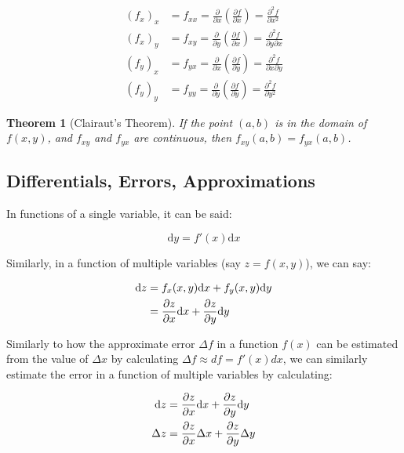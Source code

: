 \documentclass[12pt]{article}
\newtheorem{theorem}{Theorem}
\begin{document}
\begin{equation}
    \begin{split}
      (f_x)_x &= f_{xx} = \frac{\partial}{\partial x}(\frac{\partial f}{\partial x}) = \frac{\partial^2f}{\partial x^2}\\
      (f_x)_y &= f_{xy} = \frac{\partial}{\partial y}(\frac{\partial f}{\partial x}) = \frac{\partial^2f}{\partial y \partial x}\\
    (f_y)_x &= f_{yx} = \frac{\partial}{\partial x}(\frac{\partial f}{\partial y}) = \frac{\partial^2f}{\partial x \partial y}\\
    (f_y)_y &= f_{yy} = \frac{\partial}{\partial y}(\frac{\partial f}{\partial y}) = \frac{\partial^2f}{\partial y^2}
    \end{split}
\end{equation}


\begin{theorem}[Clairaut's Theorem]
    If the point $(a,b)$ is in the domain of $f(x,y)$, and $f_{xy}$ and $f_{yx}$ are continuous, then $f_{xy}(a,b)=f_{yx}(a,b)$.
\end{theorem}

\subsection{Differentials, Errors, Approximations}

In functions of a single variable, it can be said:

\[
    \text{d}y = f'(x) \text{d}x    
\]

Similarly, in a function of multiple variables (say $z = f(x,y)$), we can say:

\begin{equation}
    \begin{split}
    \text{d}z &= f_x(x,y) \text{d}x + f_y(x,y) \text{d}y\\
    &= \frac{\partial z}{\partial x} \text{d}x + \frac{\partial z}{\partial y} \text{d}y
    \end{split}
\end{equation}

Similarly to how the approximate error $\Delta f$ in a function $f(x)$ can be estimated from the value of $\Delta x$ by calculating $\Delta f \approx df =  f'(x) dx$, we can similarly estimate the error in a function of multiple variables by calculating:

\begin{equation}
    \begin{split}
     \text{d}z &= \frac{\partial z}{\partial x} \text{d}x + \frac{\partial z}{\partial y} \text{d}y\\
    \Delta z &= \frac{\partial z}{\partial x} \Delta x + \frac{\partial z}{\partial y} \Delta y   
    \end{split}
\end{equation}
\end{document}
